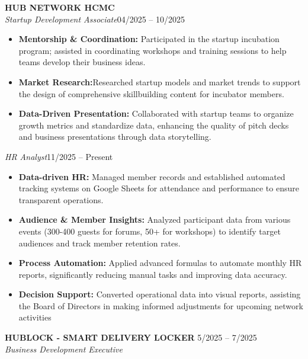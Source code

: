 \documentclass[12pt,a4paper]{article}
\begin{document}
\noindent \textbf{HUB NETWORK HCMC} \\
\textit{Startup Development Associate}\hfill 04/2025 -- 10/2025 
    \begin{itemize}[leftmargin=*, noitemsep]
        \item \textbf{Mentorship \& Coordination: }Participated in the startup incubation program; assisted in coordinating workshops and training sessions to help teams develop their business ideas.
        
        \item \textbf{Market Research:}Researched startup models and market trends to support the design of comprehensive skillbuilding content for incubator members.
        
        \item \textbf{Data-Driven Presentation: }Collaborated with startup teams to organize growth metrics and standardize data, enhancing the quality of pitch decks and business presentations through data storytelling.
    \end{itemize}
\textit{HR Analyst}\hfill 11/2025 -- Present
    \begin{itemize}
        \item \textbf{Data-driven HR:} Managed member records and established automated tracking systems on Google Sheets for attendance and performance to ensure transparent operations.
        
        \item \textbf{Audience \& Member Insights:} Analyzed participant data from various events (300-400 guests for forums, 50+ for workshops) to identify target audiences and track member retention rates.
        
        \item \textbf{Process Automation:} Applied advanced formulas to automate monthly HR reports, significantly reducing manual tasks and improving data accuracy.
        
        \item \textbf{Decision Support:} Converted operational data into visual reports, assisting the Board of Directors in making informed adjustments for upcoming network activities
    \end{itemize}
\vspace{8pt}

\newpage

\noindent \textbf{HUBLOCK - SMART DELIVERY LOCKER} \hfill 5/2025 -- 7/2025 \\
\textit{Business Development Executive} 
    
\end{document}
